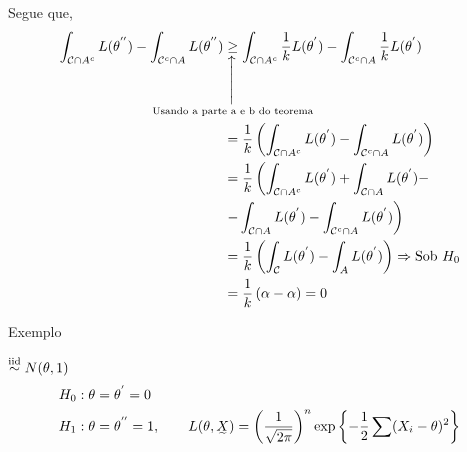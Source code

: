 \documentclass[12pt]{beamer}
\begin{document}
\begin{frame}{}
\begin{block}{}
\justifying
Segue que,
{\footnotesize
\begin{align*}
\int_{\mathcal{C}\cap A^{c}}L(\theta^{''}) -\int_{\mathcal{C}^{c}\cap A}L(\theta^{''})&\SetaUP{\text{Usando a parte a e b do teorema}}{\geq} \int_{\mathcal{C}\cap A^{c}}\dfrac{1}{k}L(\theta^{'})-\int_{\mathcal{C}^{c}\cap A}\dfrac{1}{k}L(\theta^{'})\\
&=\dfrac{1}{k}\left(\int_{\mathcal{C}\cap A^{c}}L(\theta^{'})-\int_{\mathcal{C}^{c}\cap A}L(\theta^{'})\right)\\
&=\dfrac{1}{k}\left(\int_{\mathcal{C}\cap A^{c}}L(\theta^{'})+\int_{\mathcal{C}\cap A}L(\theta^{'}) - \right.\\
&\left.-\int_{\mathcal{C}\cap A}L(\theta^{'})-\int_{\mathcal{C}^{c}\cap A}L(\theta^{'})\right)\\
&=\dfrac{1}{k}\left(\int_{\mathcal{C}}L(\theta^{'})-\int_{A}L(\theta^{'})\right)\Rightarrow \text{Sob}~H_{0}\\
&=\dfrac{1}{k}\left(\alpha-\alpha\right)=0
\end{align*}
}
\end{block}
\end{frame}


\begin{frame}{Exemplo}
\begin{block}{}
\justifying
\seqX$\overset{\text{iid}}{\sim} N(\theta,1)$
\begin{align*}
    H_{0}:\theta&=\theta^{'}=0\\
    H_{1}:\theta&=\theta^{''}=1,\quad \quad L(\theta,\undertilde{X})=\left(\dfrac{1}{\sqrt{2\pi}}\right)^{n}\exp{\left\{-\frac{1}{2}\sum(X_{i}-\theta)^{2}\right\}}
\end{align*}
\end{block}
\end{frame}
\end{document}
